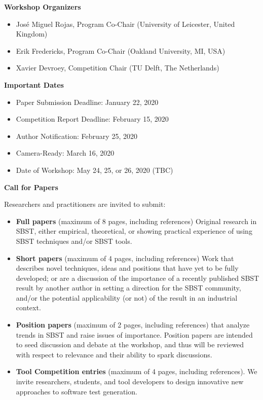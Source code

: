 \documentclass[10pt,conference]{IEEEtran}
\begin{document}
\smallskip\noindent\textbf{Workshop Organizers}
\begin{itemize}
\setlength{\itemsep}{1pt}
  \setlength{\parskip}{0pt}
  \setlength{\parsep}{0pt}
\item{Jos{\'e} Miguel Rojas, Program Co-Chair \newline 
(University of Leicester, United Kingdom)}
\item{Erik Fredericks, Program Co-Chair \newline 
    (Oakland University, MI, USA)}
\item{Xavier Devroey, Competition Chair \newline
(TU Delft, The Netherlands)}
\end{itemize}

\smallskip\noindent\textbf{Important Dates}
\begin{itemize}
\setlength{\itemsep}{1pt}
  \setlength{\parskip}{0pt}
  \setlength{\parsep}{0pt}
\item{Paper Submission Deadline: January 22, 2020}
\item{Competition Report Deadline: February 15, 2020}
\item{Author Notification: February 25, 2020}
\item{Camera-Ready: March 16, 2020}
\item{Date of Workshop: May 24, 25, or 26, 2020 (TBC)}
\end{itemize}

\smallskip\noindent\textbf{Call for Papers}

\noindent Researchers and practitioners are invited to submit:
\begin{itemize}
\setlength{\itemsep}{1pt}
  \setlength{\parskip}{0pt}
  \setlength{\parsep}{0pt}
\item \textbf{Full papers} (maximum of 8 pages, including references)
  Original research in SBST, either empirical, theoretical, or
  showing practical experience of using SBST techniques and/or SBST
  tools.
  \item \textbf{Short papers} (maximum of 4 pages, including
    references) Work that describes novel techniques, ideas and
    positions that have yet to be fully developed; or are a discussion
    of the importance of a recently published SBST result by another
    author in setting a direction for the SBST community, and/or the
    potential applicability (or not) of the result in an industrial
    context.
  \item \textbf{Position papers} (maximum of 2 pages, including
    references) that analyze trends in SBST and raise issues of
    importance. Position papers are intended to seed discussion and
    debate at the workshop, and thus will be reviewed with respect to
    relevance and their ability to spark discussions.
  \item \textbf{Tool Competition entries} (maximum of 4 pages,
    including references). We invite researchers, students, and
    tool developers to design innovative new approaches to software
    test generation.
\end{itemize}
\end{document}
